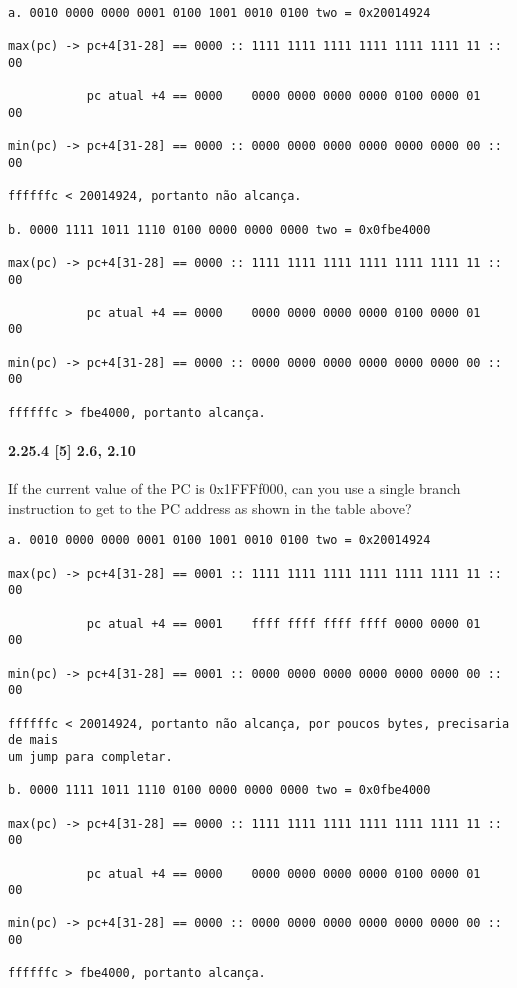 \documentclass{article}
\begin{document}
\begin{verbatim}
a. 0010 0000 0000 0001 0100 1001 0010 0100 two = 0x20014924

max(pc) -> pc+4[31-28] == 0000 :: 1111 1111 1111 1111 1111 1111 11 :: 00

           pc atual +4 == 0000    0000 0000 0000 0000 0100 0000 01    00

min(pc) -> pc+4[31-28] == 0000 :: 0000 0000 0000 0000 0000 0000 00 :: 00

ffffffc < 20014924, portanto não alcança.

b. 0000 1111 1011 1110 0100 0000 0000 0000 two = 0x0fbe4000

max(pc) -> pc+4[31-28] == 0000 :: 1111 1111 1111 1111 1111 1111 11 :: 00

           pc atual +4 == 0000    0000 0000 0000 0000 0100 0000 01    00

min(pc) -> pc+4[31-28] == 0000 :: 0000 0000 0000 0000 0000 0000 00 :: 00

ffffffc > fbe4000, portanto alcança.
\end{verbatim}

\paragraph{2.25.4  [5] 2.6, 2.10} If the current value of the PC is 0x1FFFf000,
can you use a single branch instruction to get to the PC address as shown in
the table above?

\begin{verbatim}
a. 0010 0000 0000 0001 0100 1001 0010 0100 two = 0x20014924

max(pc) -> pc+4[31-28] == 0001 :: 1111 1111 1111 1111 1111 1111 11 :: 00

           pc atual +4 == 0001    ffff ffff ffff ffff 0000 0000 01    00

min(pc) -> pc+4[31-28] == 0001 :: 0000 0000 0000 0000 0000 0000 00 :: 00

ffffffc < 20014924, portanto não alcança, por poucos bytes, precisaria de mais
um jump para completar.

b. 0000 1111 1011 1110 0100 0000 0000 0000 two = 0x0fbe4000

max(pc) -> pc+4[31-28] == 0000 :: 1111 1111 1111 1111 1111 1111 11 :: 00

           pc atual +4 == 0000    0000 0000 0000 0000 0100 0000 01    00

min(pc) -> pc+4[31-28] == 0000 :: 0000 0000 0000 0000 0000 0000 00 :: 00

ffffffc > fbe4000, portanto alcança.
\end{verbatim}
\end{document}
